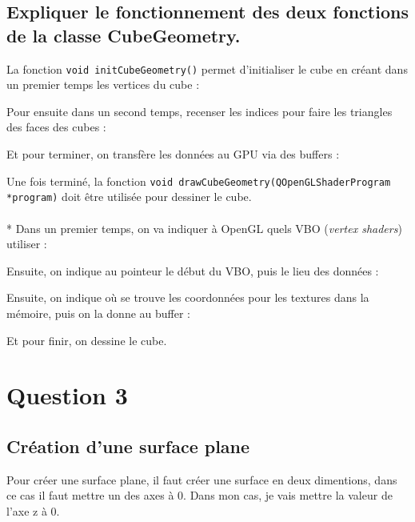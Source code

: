 \documentclass[a4paper,11pt]{report}
\begin{document}
	\subsection{Expliquer le fonctionnement des deux fonctions de la classe CubeGeometry.}
	    La fonction {\lstinline{void initCubeGeometry()}} permet d'initialiser le cube en créant dans un premier temps les vertices du cube :
    
    Pour ensuite dans un second temps, recenser les indices pour faire les triangles des faces des cubes :
    
    Et pour terminer, on transfère les données au GPU via des buffers :
    
    Une fois terminé, la fonction {\lstinline{void drawCubeGeometry(QOpenGLShaderProgram *program)}} doit être utilisée pour dessiner le cube.\\ \\*
    Dans un premier temps, on va indiquer à OpenGL quels VBO ({\it{vertex shaders}}) utiliser :
    
    Ensuite, on indique au pointeur le début du VBO, puis le lieu des données :
    
    \pagebreak
    
    Ensuite, on indique où se trouve les coordonnées pour les textures dans la mémoire, puis on la donne au buffer :
    
    
    Et pour finir, on dessine le cube.
    
	
	\pagebreak
	\section{Question 3}
	\subsection{Création d'une surface plane}
	  Pour créer une surface plane, il faut créer une surface en deux dimentions, dans ce cas il faut mettre un des axes à 0. Dans mon cas, je vais mettre la valeur de l'axe z à 0.
    	
\end{document}
